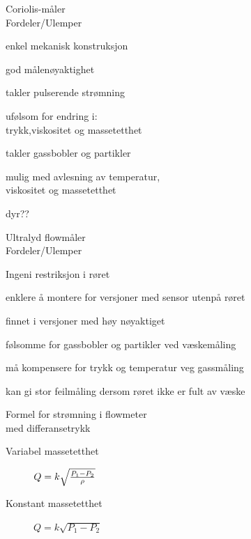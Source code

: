 \documentclass[avery5388,grid,frame]{flashcards}
\begin{document}
\begin{flashcard}{Coriolis-måler\\Fordeler/Ulemper}
	\begin{multicols}{2}
		\begin{description}
			\item [Fordeler]
			\item enkel mekanisk konstruksjon
			\item god målenøyaktighet
			\item takler pulserende strømning
			\item ufølsom for endring i:\\trykk,viskositet og massetetthet
			\item takler gassbobler og partikler
			\item mulig med avlesning av temperatur, \\ viskositet og massetetthet
		\columnbreak
			\item [Ulemper]
			\item dyr??
		\end{description}
	\end{multicols}
\end{flashcard}

\begin{flashcard}{Ultralyd flowmåler\\Fordeler/Ulemper}
	\begin{multicols}{2}
		\begin{description}
			\item [Fordeler]
			\item Ingeni restriksjon i røret
			\item enklere å montere for versjoner med sensor utenpå røret
			\item finnet i versjoner med høy nøyaktiget
		\columnbreak
			\item [Ulemper]
			\item følsomme for gassbobler og partikler ved væskemåling
			\item må kompensere for trykk og temperatur veg gassmåling
			\item kan gi stor feilmåling dersom røret ikke er fult av væske
		\end{description}
	\end{multicols}
\end{flashcard}


\begin{flashcard}{Formel for strømning i flowmeter \\ med differansetrykk}

  \begin{description}
    \item [Variabel massetetthet] $Q = k \sqrt{{P_1 - P_2} \over \rho}$ 
    \item [Konstant massetetthet] $Q = k \sqrt{P_1 - P_2 }$ 
  \end{description}


\end{flashcard}
\end{document}
